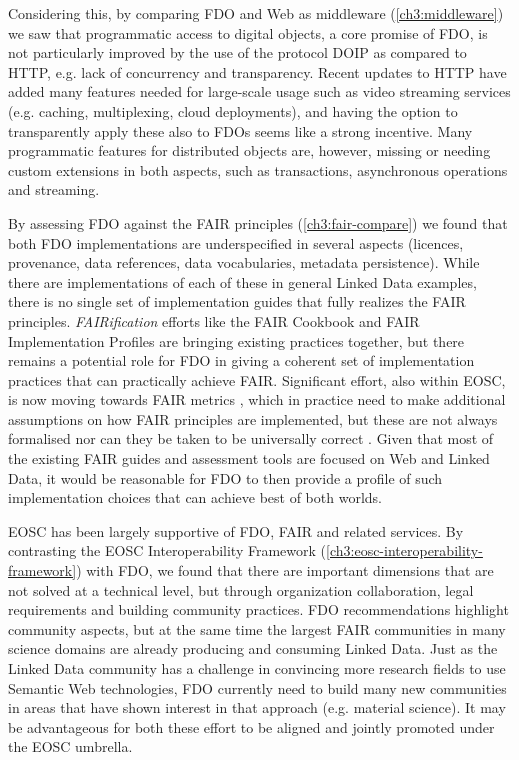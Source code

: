 Considering this, by comparing FDO and Web as middleware (\vref{ch3:middleware}) we saw that programmatic access to digital objects, a core promise of FDO, is not particularly improved by the use of the protocol DOIP as compared to HTTP, e.g. lack of concurrency and transparency. Recent updates to HTTP have added many features needed for large-scale usage such as video streaming services (e.g. caching, multiplexing, cloud deployments), and having the option to transparently apply these also to FDOs seems like a strong incentive. Many programmatic features for distributed objects are, however, missing or needing custom extensions in both aspects, such as transactions, asynchronous operations and streaming.

By assessing FDO against the FAIR principles (\vref{ch3:fair-compare}) we found that both FDO implementations are underspecified in several aspects (licences, provenance, data references, data vocabularies, metadata persistence). While there are implementations of each of these in general Linked Data examples, there is no single set of implementation guides that fully realizes the FAIR principles. \emph{FAIRification} efforts like the FAIR Cookbook \cite{Rocca-Serra 2023} and FAIR Implementation Profiles \cite{Schultes 2020} are bringing existing practices together, but there remains a potential role for FDO in giving a coherent set of implementation practices that can practically achieve FAIR. Significant effort, also within EOSC, is now moving towards FAIR metrics \cite{Devaraju 2021}, which in practice need to make additional assumptions on how FAIR principles are implemented, but these are not always formalised \cite{Wilkinson 2022a} nor can they be taken to be universally correct \cite{Verburg 2023}. Given that most of the existing FAIR guides and assessment tools are focused on Web and Linked Data, it would be reasonable for FDO to then provide a profile of such implementation choices that can achieve best of both worlds.

EOSC has been largely supportive of FDO, FAIR and related services. By contrasting the EOSC Interoperability Framework (\vref{ch3:eosc-interoperability-framework}) with FDO, we found that there are important dimensions that are not solved at a technical level, but through organization collaboration, legal requirements and building community practices. FDO recommendations highlight community aspects, but at the same time the largest FAIR communities in many science domains are already producing and consuming Linked Data. Just as the Linked Data community has a challenge in convincing more research fields to use Semantic Web technologies, FDO currently need to build many new communities in areas that have shown interest in that approach (e.g. material science).  It may be advantageous for both these effort to be aligned and jointly promoted under the EOSC umbrella. 




